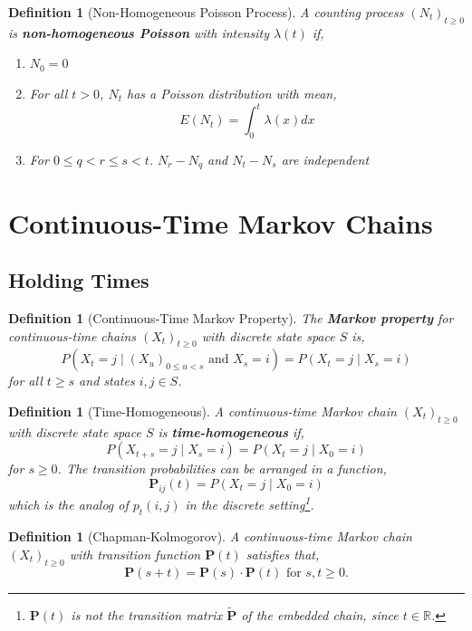 \documentclass{tufte-handout}
\newtheorem{defn}[thm]{Definition}
\begin{document}
\begin{defn}[Non-Homogeneous Poisson Process]
  A counting process $(N_t)_{t \geq 0}$ is \textbf{non-homogeneous Poisson} with intensity $\lambda(t)$ if,
  \begin{enumerate}
    \item $N_0 = 0$
    \item For all $t > 0$, $N_t$ has a Poisson distribution with mean,
    \[E\left(N_{t}\right)=\int_{0}^{t} \lambda(x) d x\]
    \item For $0 \leq q < r \leq s < t$. $N_r - N_q$ and $N_t - N_s$ are independent
  \end{enumerate}
\end{defn}

\section{Continuous-Time Markov Chains}
\subsection{Holding Times}
\begin{defn}[Continuous-Time Markov Property]
  The \textbf{Markov property} for continuous-time chains $(X_t)_{t \geq 0}$ with discrete state space $S$ is,
  \[P\left(X_{t}=j \mid \left(X_{u}\right)_{0 \leq u < s} \text{ and } X_{s}=i\right)=P\left(X_{t}=j \mid X_{s}=i\right)\]
  \noindent for all $t \geq s$ and states $i, j \in S$.
\end{defn}

\begin{defn}[Time-Homogeneous]
  A continuous-time Markov chain $(X_t)_{t \geq 0}$ with discrete state space $S$ is \textbf{time-homogeneous} if,
  \[P\left(X_{t+s}=j \mid X_{s}=i\right) = P\left(X_{t}=j \mid X_{0}=i\right)\]
  \noindent for $s \geq 0$. The transition probabilities can be arranged in a function,
  \[\mathbf{P}_{i j}(t)=P\left(X_{t}=j \mid X_{0}=i\right)\]
  \noindent which is the analog of $p_t(i,j)$ in the discrete setting\footnote{$\mathbf{P}(t)$ is not the transition matrix $\tilde{\mathbf{P}}$ of the embedded chain, since $t \in \mathbb{R}$.}.
\end{defn}

\begin{defn}[Chapman-Kolmogorov]
  A continuous-time Markov chain $(X_t)_{t \geq 0}$ with transition function $\mathbf{P}(t)$ satisfies that,
  \[\mathbf{P}(s + t) = \mathbf{P}(s) \cdot \mathbf{P}(t) \text{ for $s, t \geq 0$.}\]
\end{defn}
\end{document}
